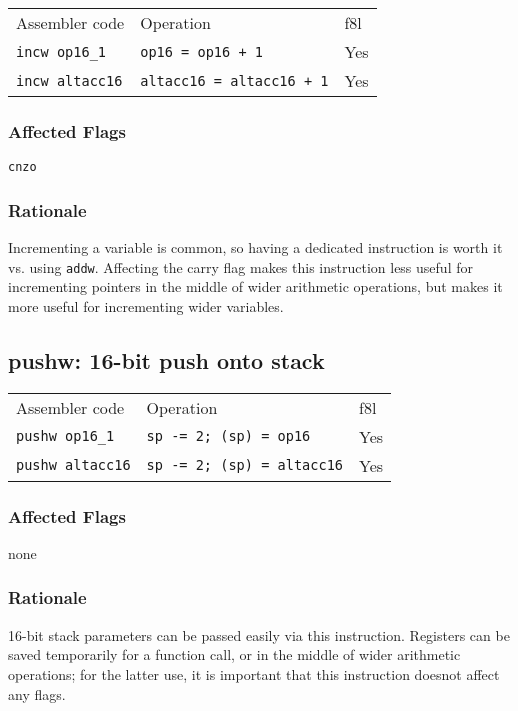 \documentclass{book}
\begin{document}
\begin{tabular}{l l l}
Assembler code         & Operation                        & f8l \\
\texttt{incw op16\_1}  & \texttt{op16 = op16 + 1}         & Yes \\
\texttt{incw altacc16} & \texttt{altacc16 = altacc16 + 1} & Yes
\end{tabular}

\subsubsection*{Affected Flags}

\texttt{cnzo}

\subsubsection*{Rationale}

Incrementing a variable is common, so having a dedicated instruction is worth it vs. using \texttt{addw}. Affecting the carry flag makes this instruction less useful for incrementing pointers in the middle of wider arithmetic operations, but makes it more useful for incrementing wider variables.


\subsection{pushw: 16-bit push onto stack}

\begin{tabular}{l l l}
Assembler code          & Operation                         & f8l \\
\texttt{pushw op16\_1}  & \texttt{sp -= 2; (sp) = op16}     & Yes \\
\texttt{pushw altacc16} & \texttt{sp -= 2; (sp) = altacc16} & Yes
\end{tabular}

\subsubsection*{Affected Flags}

none

\subsubsection*{Rationale}

16-bit stack parameters can be passed easily via this instruction. Registers can be saved temporarily for a function call, or in the middle of wider arithmetic operations; for the latter use, it is important that this instruction doesnot affect any flags.
\end{document}
